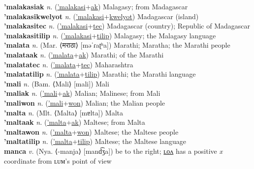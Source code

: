 \textbf{'malakasiak} \textit{n.} (\hyperref['malakasi]{'malakasi}+\hyperref[ak]{ak})
Malagasy; from Madagascar \label{'malakasiak} \\
\textbf{'malakasikwelyot} \textit{n.} (\hyperref['malakasi]{'malakasi}+\hyperref[kwelyot]{kwelyot})
Madagascar (island) \label{'malakasikwelyot} \\
\textbf{'malakasitec} \textit{n.} (\hyperref['malakasi]{'malakasi}+\hyperref[tec]{tec})
Madagascar (country); Republic of Madagascar \label{'malakasitec} \\
\textbf{'malakasitilip} \textit{n.} (\hyperref['malakasi]{'malakasi}+\hyperref[tilip]{tilip})
Malagasy; the Malagasy language \label{'malakasitilip} \\
\textbf{'malata} \textit{n.} (Mar. ⟨मराठा⟩ [məˈɾaʈʰa])
Marathi; Maratha; the Marathi people \label{'malata} \\
\textbf{'malataak} \textit{n.} (\hyperref['malata]{'malata}+\hyperref[ak]{ak})
Marathi; of the Marathi \label{'malataak} \\
\textbf{'malatatec} \textit{n.} (\hyperref['malata]{'malata}+\hyperref[tec]{tec})
Maharashtra \label{'malatatec} \\
\textbf{'malatatilip} \textit{n.} (\hyperref['malata]{'malata}+\hyperref[tilip]{tilip})
Marathi; the Marathi language \label{'malatatilip} \\
\textbf{'mali} \textit{n.} (Bam. ⟨Mali⟩ [mali])
Mali \label{'mali} \\
\textbf{'maliak} \textit{n.} (\hyperref['mali]{'mali}+\hyperref[ak]{ak})
Malian; Malinese; from Mali \label{'maliak} \\
\textbf{'maliwon} \textit{n.} (\hyperref['mali]{'mali}+\hyperref[won]{won})
Malian; the Malian people \label{'maliwon} \\
\textbf{'malta} \textit{n.} (Mlt. ⟨Malta⟩ [mɐlta])
Malta \label{'malta} \\
\textbf{'maltaak} \textit{n.} (\hyperref['malta]{'malta}+\hyperref[ak]{ak})
Maltese; from Malta \label{'maltaak} \\
\textbf{'maltawon} \textit{n.} (\hyperref['malta]{'malta}+\hyperref[won]{won})
Maltese; the Maltese people \label{'maltawon} \\
\textbf{'maltatilip} \textit{n.} (\hyperref['malta]{'malta}+\hyperref[tilip]{tilip})
Maltese; the Maltese language \label{'maltatilip} \\
\textbf{manca} \textit{v.} (Nya. ⟨-manja⟩ [mand͡ʒa])
be to the right; \hyperref[mancalon]{ʟᴏᴧ} has a positive \textit{x} coordinate from ʟᴜᴍ’s point of view \label{manca} \\
